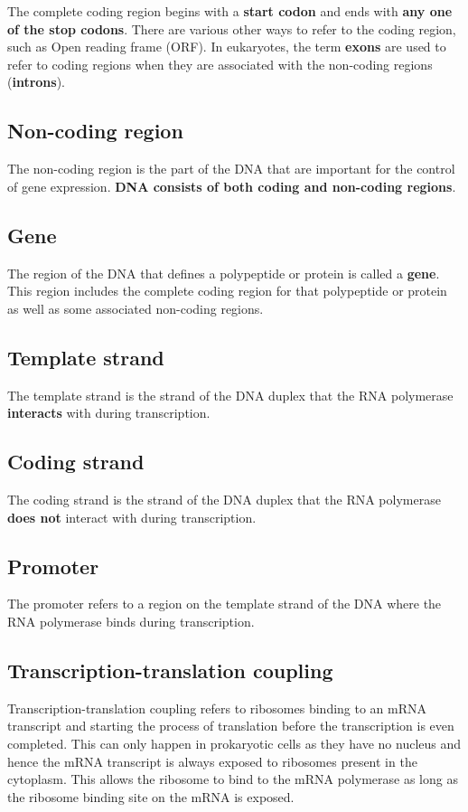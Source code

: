 \documentclass[11pt]{article}
\begin{document}
The complete coding region begins with a \textbf{start codon} and ends with \textbf{any one of the stop codons}. There are various other ways to refer to the coding region, such as Open reading frame (ORF). In eukaryotes, the term \textbf{exons} are used to refer to coding regions when they are associated with the non-coding regions (\textbf{introns}).

\subsection{Non-coding region}
\label{sec:orge0b8b09}
The non-coding region is the part of the DNA that are important for the control of gene expression. \textbf{DNA consists of both coding and non-coding regions}.

\subsection{Gene}
\label{sec:org3d5b98a}
The region of the DNA that defines a polypeptide or protein is called a \textbf{gene}. This region includes the complete coding region for that polypeptide or protein as well as some associated non-coding regions.

\subsection{Template strand}
\label{sec:orgc905c09}
The template strand is the strand of the DNA duplex that the RNA polymerase \textbf{interacts} with during transcription.

\subsection{Coding strand}
\label{sec:org3161b3e}
The coding strand is the strand of the DNA duplex that the RNA polymerase \textbf{does not} interact with during transcription.

\subsection{Promoter}
\label{sec:orgc7bc087}
The promoter refers to a region on the template strand of the DNA where the RNA polymerase binds during transcription.

\newpage

\subsection{Transcription-translation coupling}
\label{sec:orgbba6e1a}
Transcription-translation coupling refers to ribosomes binding to an mRNA transcript and starting the process of translation before the transcription is even completed. This can only happen in prokaryotic cells as they have no nucleus and hence the mRNA transcript is always exposed to ribosomes present in the cytoplasm. This allows the ribosome to bind to the mRNA polymerase as long as the ribosome binding site on the mRNA is exposed.
\end{document}
